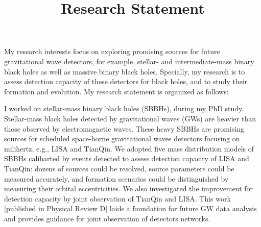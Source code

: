 \documentclass[12pt,a4paper,sans]{article}%
\title{\vspace{-2.5cm}\Huge Research Statement \vspace{-2.2em}}
\date{}
\begin{document}
\maketitle

My research interests focus on exploring promising sources for future gravitational wave detectors, for example, stellar- and
intermediate-mass binary black holes as well as massive binary black holes. Specially, my research is to assess detection capacity of
these detectors for black holes, and to study their formation and evolution. My research statement is organized as
follows:  

I worked on stellar-mass binary black holes (SBBHs), during my PhD study. Stellar-mass black holes detected by
gravitational waves (GWs) are heavier than those observed by electromagnetic waves. These heavy SBBHs are promising sources for scheduled
space-borne gravitational waves detectors focusing on milihertz, e.g., LISA and TianQin. We adopted five mass
distribution models of SBBHs calibarted by events detected to assess detection capacity of
LISA and TianQin: dozens of sources could be resolved, source parameters could be measured accurately, and formation
scenarios could be distinguished by measuring their orbital eccentricities. We also investigated the improvement for detection capacity by joint
observation of TianQin and LISA. This work [published in Physical Review D] laids a foundation for future GW data analysis and provides
guidance for joint observation of detectors networks. 
\end{document}
